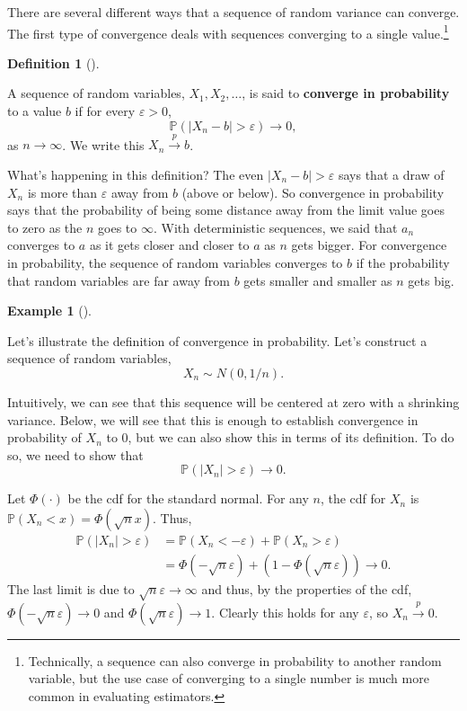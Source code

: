 \documentclass[
  letterpaper,
  DIV=11,
  numbers=noendperiod]{scrreprt}
\renewcommand{\P}{\mathbb{P}}
\newcommand{\inprob}{\overset{p}{\to}}
\theoremstyle{definition}
\newtheorem{definition}{Definition}[chapter]
\theoremstyle{plain}
\theoremstyle{definition}
\newtheorem{example}{Example}[chapter]
\theoremstyle{remark}
\begin{document}
There are several different ways that a sequence of random variance can
converge. The first type of convergence deals with sequences converging
to a single value.\footnote{Technically, a sequence can also converge in
  probability to another random variable, but the use case of converging
  to a single number is much more common in evaluating estimators.}

\begin{definition}[]\protect\hypertarget{def-inprob}{}\label{def-inprob}

A sequence of random variables, \(X_1, X_2, \ldots\), is said to
\textbf{converge in probability} to a value \(b\) if for every
\(\varepsilon > 0\), \[
\P(|X_n - b| > \varepsilon) \rightarrow 0,
\] as \(n\rightarrow \infty\). We write this \(X_n \inprob b\).

\end{definition}

What's happening in this definition? The even
\(|X_n - b| > \varepsilon\) says that a draw of \(X_n\) is more than
\(\varepsilon\) away from \(b\) (above or below). So convergence in
probability says that the probability of being some distance away from
the limit value goes to zero as the \(n\) goes to \(\infty\). With
deterministic sequences, we said that \(a_n\) converges to \(a\) as it
gets closer and closer to \(a\) as \(n\) gets bigger. For convergence in
probability, the sequence of random variables converges to \(b\) if the
probability that random variables are far away from \(b\) gets smaller
and smaller as \(n\) gets big.

\begin{example}[]\protect\hypertarget{exm-inprob}{}\label{exm-inprob}

Let's illustrate the definition of convergence in probability. Let's
construct a sequence of random variables, \[
X_n \sim N(0, 1/n).
\]

Intuitively, we can see that this sequence will be centered at zero with
a shrinking variance. Below, we will see that this is enough to
establish convergence in probability of \(X_n\) to 0, but we can also
show this in terms of its definition. To do so, we need to show that \[
\P(|X_n| > \varepsilon) \to 0.
\]

Let \(\Phi(\cdot)\) be the cdf for the standard normal. For any \(n\),
the cdf for \(X_n\) is \(\P(X_{n} < x) = \Phi(\sqrt{n}x)\). Thus, \[
\begin{aligned}
\P(|X_n| > \varepsilon) &= \P(X_n < -\varepsilon) + \P(X_n > \varepsilon) \\ &= \Phi(-\sqrt{n}\varepsilon) + (1 - \Phi(\sqrt{n}\varepsilon)) \to 0.
\end{aligned}
\] The last limit is due to \(\sqrt{n}\varepsilon \to \infty\) and thus,
by the properties of the cdf, \(\Phi(-\sqrt{n}\varepsilon) \to 0\) and
\(\Phi(\sqrt{n}\varepsilon) \to 1\). Clearly this holds for any
\(\varepsilon\), so \(X_n \inprob 0\).

\end{example}
\end{document}
